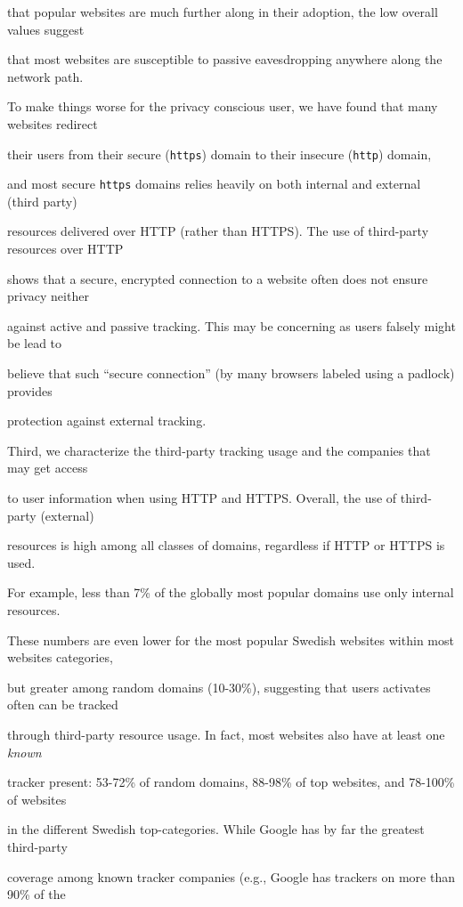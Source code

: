 \documentclass{sig-alternate-10pt}
\begin{document}
that popular websites are much further along in their adoption, the low overall values suggest 

that most websites are susceptible to passive eavesdropping anywhere along the network path.  

To make things worse for the privacy conscious user, we have found that many websites redirect 

their users from their secure (\texttt{https}) domain to their insecure (\texttt{http}) domain, 

and most secure \texttt{https} domains relies heavily on both internal and external (third party) 

resources delivered over HTTP (rather than HTTPS).  The use of third-party resources over HTTP 

shows that a secure, encrypted connection to a website often does not ensure privacy neither 

against active and passive tracking.  This may be concerning as users falsely might be lead to 

believe that such “secure connection” (by many browsers labeled using a padlock) provides 

protection against external tracking.



Third, we characterize the third-party tracking usage and the companies that may get access 

to user information when using HTTP and HTTPS.  Overall, the use of third-party (external) 

resources is high among all classes of domains, regardless if HTTP or HTTPS is used.  

For example, less than 7\% of the globally most popular domains use only internal resources.  

These numbers are even lower for the most popular Swedish websites within most websites categories, 

but greater among random domains (10-30\%), suggesting that users activates often can be tracked 

through third-party resource usage.  In fact, most websites also have at least one {\em known} 

tracker present: 53-72\% of random domains, 88-98\% of top websites, and 78-100\% of websites 

in the different Swedish top-categories.  While Google has by far the greatest third-party 

coverage among known tracker companies (e.g., Google has trackers on more than 90\% of the 
\end{document}
